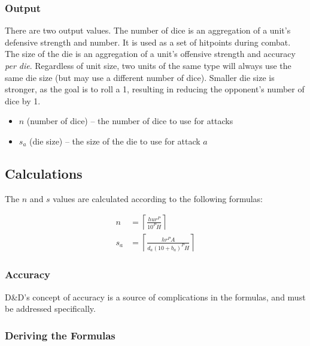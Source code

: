 \documentclass[twocolumn]{article}
\begin{document}
\subsubsection{Output}

There are two output values.
The number of dice is an aggregation of a unit's defensive strength and number.
It is used as a set of hitpoints during combat.
The size of the die is an aggregation
of a unit's offensive strength and accuracy \emph{per die}.
Regardless of unit size,
two units of the same type will always use the same die size
(but may use a different number of dice).
Smaller die size is stronger,
as the goal is to roll a 1,
resulting in reducing the opponent's number of dice by 1.

\begin{itemize}
    \item $n$ (number of dice) -- the number of dice to use for attacks
    \item $s_a$ (die size) -- the size of the die to use for attack $a$
\end{itemize}

\subsection{Calculations}

The $n$ and $s$ values are calculated according to the following formulas:

\begin{align*}
    n   &=  
        \left\lceil
            \frac
                {h u r^P}
                {10^P H}
        \right\rceil \\
    s_a &=
        \left\lceil
            \frac
                {h r^P A}
                {d_a (10 + b_{a})^P H}
        \right\rceil
\end{align*}

\subsubsection{Accuracy}

D\&D's concept of accuracy is a source of complications in the formulas,
and must be addressed specifically.




\subsubsection{Deriving the Formulas}
\end{document}
